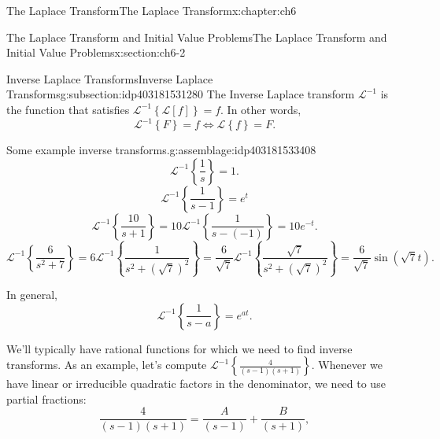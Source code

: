 \documentclass[oneside,10pt,]{book}
\numberwithin{equation}{section}
\numberwithin{equation}{section}
\begin{document}
\begin{chapterptx}{The Laplace Transform}{}{The Laplace Transform}{}{}{x:chapter:ch6}
\begin{sectionptx}{The Laplace Transform and Initial Value Problems}{}{The Laplace Transform and Initial Value Problems}{}{}{x:section:ch6-2}
\begin{introduction}{}
\end{introduction}%
%
%
\typeout{************************************************}
\typeout{************************************************}
%
\begin{subsectionptx}{Inverse Laplace Transforms}{}{Inverse Laplace Transforms}{}{}{g:subsection:idp403181531280}
The Inverse Laplace transform \(\mathcal{L}^{-1}\) is the function that satisfies \(\mathcal{L}^{-1}\left\{ \mathcal{L}\left[f\right]\right\} =f\). In other words,%
\begin{equation*}
\mathcal{L}^{-1}\left\{ F\right\} =f\iff\mathcal{L}\left\{ f\right\} =F.
\end{equation*}
%
\begin{assemblage}{Some example inverse transforms.}{g:assemblage:idp403181533408}%
%
\begin{equation*}
\mathcal{L}^{-1}\left\{ \frac{1}{s}\right\} =1\text{.}
\end{equation*}
%
\begin{equation*}
\mathcal{L}^{-1}\left\{ \frac{1}{s-1}\right\} =e^{t}
\end{equation*}
%
\begin{equation*}
\mathcal{L}^{-1}\left\{ \frac{10}{s+1}\right\} =10\mathcal{L}^{-1}\left\{ \frac{1}{s-(-1)}\right\} =10e^{-t}\text{.}
\end{equation*}
%
\begin{equation*}
\mathcal{L}^{-1}\left\{ \frac{6}{s^{2}+7}\right\} =6\mathcal{L}^{-1}\left\{ \frac{1}{s^{2}+\left(\sqrt{7}\right)^{2}}\right\} =\frac{6}{\sqrt{7}}\mathcal{L}^{-1}\left\{ \frac{\sqrt{7}}{s^{2}+\left(\sqrt{7}\right)^{2}}\right\} =\frac{6}{\sqrt{7}}\sin\left(\sqrt{7}t\right)\text{.}
\end{equation*}
%
\end{assemblage}
In general,%
\begin{equation*}
\mathcal{L}^{-1}\left\{ \frac{1}{s-a}\right\} =e^{at}.
\end{equation*}
%
\par
We'll typically have rational functions for which we need to find inverse transforms. As an example, let's compute \(\mathcal{L}^{-1}\left\{ \frac{4}{\left(s-1\right)\left(s+1\right)}\right\} \). Whenever we have linear or irreducible quadratic factors in the denominator, we need to use partial fractions:%
\begin{equation*}
\frac{4}{\left(s-1\right)\left(s+1\right)}=\frac{A}{\left(s-1\right)}+\frac{B}{\left(s+1\right)},
\end{equation*}

\end{subsectionptx}
\end{sectionptx}
\end{chapterptx}
\end{document}
